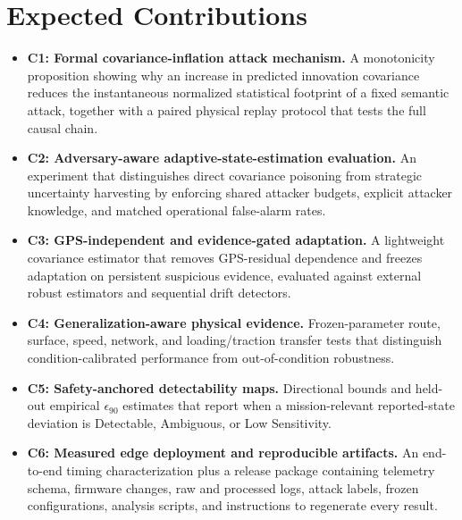 \documentclass[11pt,a4paper]{article}
\begin{document}
\section{Expected Contributions}
\begin{itemize}
    \item \textbf{C1: Formal covariance-inflation attack mechanism.} A monotonicity proposition showing why an increase in predicted innovation covariance reduces the instantaneous normalized statistical footprint of a fixed semantic attack, together with a paired physical replay protocol that tests the full causal chain.
    \item \textbf{C2: Adversary-aware adaptive-state-estimation evaluation.} An experiment that distinguishes direct covariance poisoning from strategic uncertainty harvesting by enforcing shared attacker budgets, explicit attacker knowledge, and matched operational false-alarm rates.
    \item \textbf{C3: GPS-independent and evidence-gated adaptation.} A lightweight covariance estimator that removes GPS-residual dependence and freezes adaptation on persistent suspicious evidence, evaluated against external robust estimators and sequential drift detectors.
    \item \textbf{C4: Generalization-aware physical evidence.} Frozen-parameter route, surface, speed, network, and loading/traction transfer tests that distinguish condition-calibrated performance from out-of-condition robustness.
    \item \textbf{C5: Safety-anchored detectability maps.} Directional bounds and held-out empirical $\epsilon_{90}$ estimates that report when a mission-relevant reported-state deviation is Detectable, Ambiguous, or Low Sensitivity.
    \item \textbf{C6: Measured edge deployment and reproducible artifacts.} An end-to-end timing characterization plus a release package containing telemetry schema, firmware changes, raw and processed logs, attack labels, frozen configurations, analysis scripts, and instructions to regenerate every result.
\end{itemize}
\end{document}
